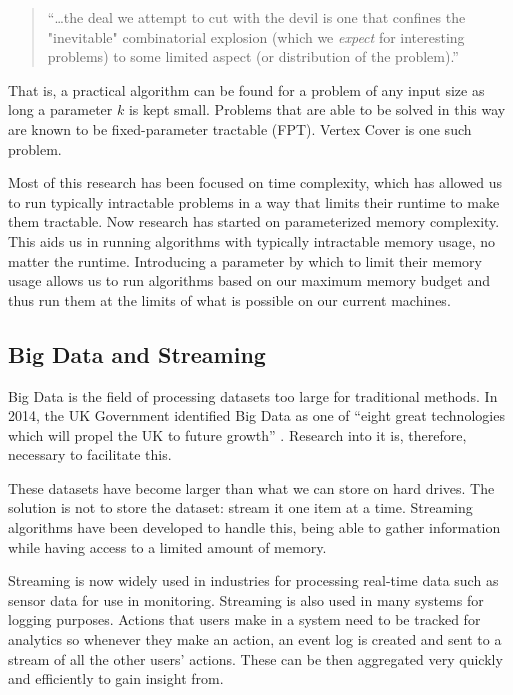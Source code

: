 \begin{quote}
    ``\dots the deal we attempt to cut with the devil is one that confines the
    "inevitable" combinatorial explosion (which we \textit{expect} for
    interesting problems) to some limited aspect (or distribution of the
    problem).''
\end{quote}

That is, a practical algorithm can be found for a problem of any input size as
long a parameter \(k\) is kept small. Problems that are able to be solved in this
way are known to be fixed-parameter tractable (FPT). Vertex Cover is one such
problem.

Most of this research has been focused on time complexity, which has allowed us
to run typically intractable problems in a way that limits their runtime to
make them tractable. Now research has started on parameterized memory
complexity. This aids us in running algorithms with typically intractable
memory usage, no matter the runtime. Introducing a parameter by which to limit
their memory usage allows us to run algorithms based on our maximum memory
budget and thus run them at the limits of what is possible on our current
machines.

\subsection{Big Data and Streaming}

Big Data is the field of processing datasets too large for traditional methods.
In 2014, the UK Government identified Big Data as one of ``eight great
technologies which will propel the UK to future growth''
\cite{intellectualpropertyoffice2014}. Research into it is, therefore,
necessary to facilitate this.

These datasets have become larger than what we can store on hard drives. The
solution is not to store the dataset: stream it one item at a time. Streaming
algorithms have been developed to handle this, being able to gather information
while having access to a limited amount of memory.

Streaming is now widely used in industries for processing real-time data such
as sensor data for use in monitoring. Streaming is also used in many systems
for logging purposes. Actions that users make in a system need to be tracked
for analytics so whenever they make an action, an event log is created and sent
to a stream of all the other users' actions. These can be then aggregated very
quickly and efficiently to gain insight from.

